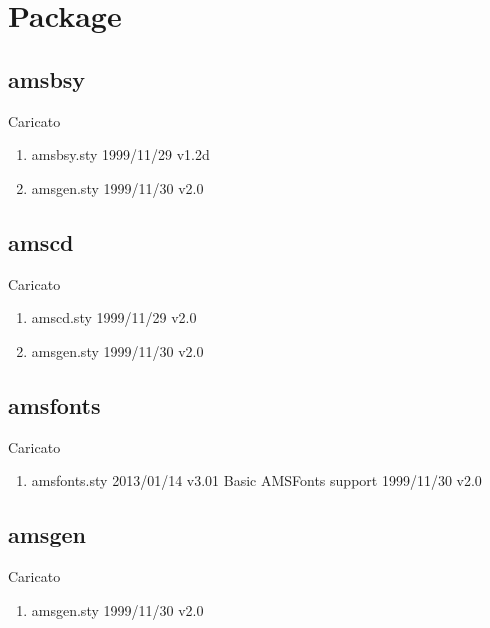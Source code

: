 
\chapter{Package}
\lstset{language=[LaTeX]TeX} 
\section{amsbsy}

Caricato 
\begin{enumerate}
\item amsbsy.sty 1999/11/29 v1.2d
\item amsgen.sty 1999/11/30 v2.0
\end{enumerate}
\section{amscd}

Caricato 
\begin{enumerate}
\item amscd.sty 1999/11/29 v2.0
\item amsgen.sty 1999/11/30 v2.0
\end{enumerate}
\section{amsfonts}

Caricato 
\begin{enumerate}
\item amsfonts.sty 2013/01/14 v3.01 Basic AMSFonts support 1999/11/30 v2.0
\end{enumerate}
\section{amsgen}

Caricato 
\begin{enumerate}
\item amsgen.sty 1999/11/30 v2.0
\end{enumerate}
